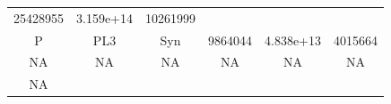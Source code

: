 \documentclass[]{article}
\begin{document}
\begin{longtable}[]{@{}cccccc@{}}
\begin{minipage}[t]{0.10\columnwidth}
25428955\strut
\end{minipage} & \begin{minipage}[t]{0.12\columnwidth}\centering\strut
3.159e+14\strut
\end{minipage} & \begin{minipage}[t]{0.12\columnwidth}\centering\strut
10261999\strut
\end{minipage}\tabularnewline
\begin{minipage}[t]{0.07\columnwidth}\centering\strut
P\strut
\end{minipage} & \begin{minipage}[t]{0.07\columnwidth}\centering\strut
PL3\strut
\end{minipage} & \begin{minipage}[t]{0.12\columnwidth}\centering\strut
Syn\strut
\end{minipage} & \begin{minipage}[t]{0.10\columnwidth}\centering\strut
9864044\strut
\end{minipage} & \begin{minipage}[t]{0.12\columnwidth}\centering\strut
4.838e+13\strut
\end{minipage} & \begin{minipage}[t]{0.12\columnwidth}\centering\strut
4015664\strut
\end{minipage}\tabularnewline
\begin{minipage}[t]{0.07\columnwidth}\centering\strut
NA\strut
\end{minipage} & \begin{minipage}[t]{0.07\columnwidth}\centering\strut
NA\strut
\end{minipage} & \begin{minipage}[t]{0.12\columnwidth}\centering\strut
NA\strut
\end{minipage} & \begin{minipage}[t]{0.10\columnwidth}\centering\strut
NA\strut
\end{minipage} & \begin{minipage}[t]{0.12\columnwidth}\centering\strut
NA\strut
\end{minipage} & \begin{minipage}[t]{0.12\columnwidth}\centering\strut
NA\strut
\end{minipage}\tabularnewline
\begin{minipage}[t]{0.07\columnwidth}\centering\strut
NA\strut
\end{minipage} & \begin{minipage}[t]{0.07\columnwidth}\centering\strut

\end{minipage}
\end{longtable}
\end{document}
